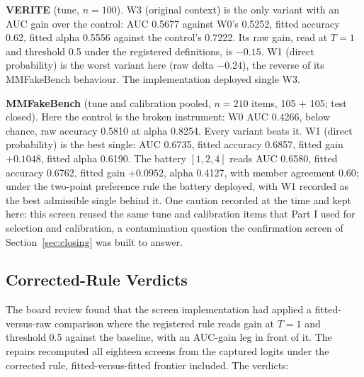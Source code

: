\documentclass{article} %
\begin{document}
\textbf{VERITE} (tune, \(n=100\)). W3 (original context) is the only variant with an AUC gain over the control: AUC 0.5677 against W0's 0.5252, fitted accuracy 0.62, fitted alpha 0.5556 against the control's 0.7222. Its raw gain, read at \(T=1\) and threshold 0.5 under the registered definitions, is \(-0.15\). W1 (direct probability) is the worst variant here (raw delta \(-0.24\)), the reverse of its MMFakeBench behaviour. The implementation deployed single W3.

\textbf{MMFakeBench} (tune and calibration pooled, \(n=210\) items, 105 \(+\) 105; test closed). Here the control is the broken instrument: W0 AUC 0.4266, below chance, raw accuracy 0.5810 at alpha 0.8254. Every variant beats it. W1 (direct probability) is the best single: AUC 0.6735, fitted accuracy 0.6857, fitted gain \(+0.1048\), fitted alpha 0.6190. The battery \([1, 2, 4]\) reads AUC 0.6580, fitted accuracy 0.6762, fitted gain \(+0.0952\), alpha 0.4127, with member agreement 0.60; under the two-point preference rule the battery deployed, with W1 recorded as the best admissible single behind it. One caution recorded at the time and kept here: this screen reused the same tune and calibration items that Part I used for selection and calibration, a contamination question the confirmation screen of Section~\ref{sec:closing} was built to answer.

\subsection{Corrected-Rule Verdicts}
The board review found that the screen implementation had applied a fitted-versus-raw comparison where the registered rule reads gain at \(T=1\) and threshold 0.5 against the baseline, with an AUC-gain leg in front of it. The repairs recomputed all eighteen screens from the captured logits under the corrected rule, fitted-versus-fitted frontier included. The verdicts:
\end{document}
